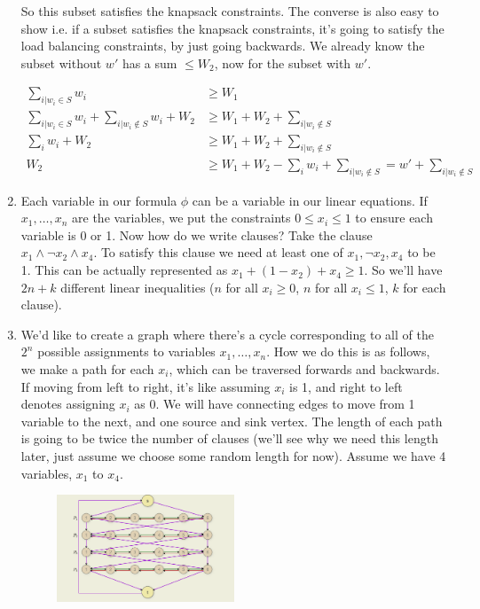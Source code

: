 \documentclass[12pt]{report}
\begin{document}
\begin{enumerate}[label=\textbf{\arabic*.}]
    So this subset satisfies the knapsack constraints. The converse is also easy to show i.e. if a subset satisfies the knapsack constraints, it's
    going to satisfy the load balancing constraints, by just going backwards. We already know the subset without $w'$ has a sum $\leq W_2$, now for the 
    subset with $w'$.

    \begin{align*}
        \sum_{i| w_i \in S} w_i &\geq W_1 \\
        \sum_{i| w_i \in S} w_i + \sum_{i| w_i \notin S} w_i + W_2 &\geq W_1 + W_2 + \sum_{i| w_i \notin S} \\
        \sum_i w_i + W_2 &\geq W_1 + W_2 + \sum_{i| w_i \notin S} \\
        W_2 &\geq W_1 + W_2 - \sum_i w_i + \sum_{i| w_i \notin S} = w' + \sum_{i| w_i \notin S}
    \end{align*}

    \item Each variable in our formula $\phi$ can be a variable in our linear equations. If $x_1, \dots, x_n$ are the variables, we put the 
    constraints $0 \leq x_i \leq 1$ to ensure each variable is 0 or 1. Now how do we write clauses? Take the clause $x_1 \land \lnot x_2 \land x_4$.
    To satisfy this clause we need at least one of $x_1, \lnot x_2, x_4$ to be 1. This can be actually represented as $x_1 + (1 - x_2) + x_4 \geq 1$.
    So we'll have $2n + k$ different linear inequalities ($n$ for all $x_i \geq 0$, $n$ for all $x_i \leq 1$, $k$ for each clause).

    \item We'd like to create a graph where there's a cycle corresponding to all of the $2^n$ possible assignments to variables $x_1, \dots, x_n$.
    How we do this is as follows, we make a path for each $x_i$, which can be traversed forwards and backwards. If moving from left to right, it's
    like assuming $x_i$ is 1, and right to left denotes assigning $x_i$ as 0. We will have connecting edges to move from 1 variable to the next,
    and one source and sink vertex. The length of each path is going to be twice the number of clauses (we'll see why we need this length later,
    just assume we choose some random length for now). Assume we have 4 variables, $x_1$ to $x_4$.

    \begin{figure}[H]
        \centering
        \includegraphics[width=0.5\textwidth]{Hamiltonian1.png}  
    \end{figure}


\end{enumerate}
\end{document}
